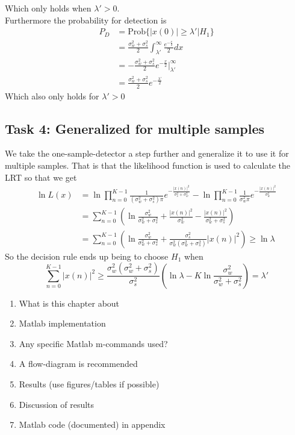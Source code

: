 Which only holds when $\lambda'>0$.\\
Furthermore the probability for detection is
\begin{align}
    P_D & = \text{Prob}\{|x(0)|\geq\lambda'\vert H_1\}\nonumber\\
    & = \frac{\sigma_w^2+\sigma_s^2}{2}\int_{\lambda'}^{\infty}\frac{e^{-\frac{x}{2}}}{2}dx\nonumber\\
    & = -\frac{\sigma_w^2+\sigma_s^2}{2}e^{-\frac{x}{2}}\bigg\rvert_{\lambda'}^{\infty}\nonumber\\
    & = \frac{\sigma_w^2+\sigma_s^2}{2}e^{-\frac{\lambda'}{2}}\nonumber
\end{align}
Which also only holds for $\lambda'>0$\\
\subsection{Task 4: Generalized for multiple samples}
We take the one-sample-detector a step further and generalize it to use it for multiple samples. That is that the likelihood function is used to calculate the LRT so that we get
\begin{align}
    \ln L(x) & = \ln\prod_{n=0}^{K-1}\frac{1}{(\sigma_w^2+\sigma_s^2)\pi}e^{-\frac{|x(n)|^2}{\sigma_s^2+\sigma_w^2}}-\ln\prod_{n=0}^{K-1}\frac{1}{\sigma_w^2\pi}e^{-\frac{|x(n)|^2}{\sigma_w^2}}\nonumber\\
    & = \sum_{n=0}^{K-1}\left(\ln\frac{\sigma_w^2}{\sigma_w^2+\sigma_s^2} + \frac{|x(n)|^2}{\sigma_w^2}-\frac{|x(n)|^2}{\sigma_w^2+\sigma_s^2} \right)\nonumber\\
    & = \sum_{n=0}^{K-1}\left(\ln\frac{\sigma_w^2}{\sigma_w^2+\sigma_s^2} + \frac{\sigma_s^2}{\sigma_w^2(\sigma_w^2+\sigma_s^2)}|x(n)|^2\right)\geq\ln\lambda\nonumber
\end{align}
So the decision rule ends up being to choose $H_1$ when
\begin{equation}
    \sum_{n=0}^{K-1}|x(n)|^2 \geq \frac{\sigma_w^2(\sigma_w^2+\sigma_s^2)}{\sigma_s^2}\left(\ln\lambda-K\ln\frac{\sigma_w^2}{\sigma_w^2+\sigma_s^2}\right) = \lambda'
\end{equation}
\begin{enumerate}[i]
    \item What is this chapter about
    \item Matlab implementation
    \item Any specific Matlab m-commands used?
    \item A flow-diagram is recommended
    \item Results (use figures/tables if possible)
    \item Discussion of results
    \item Matlab code (documented) in appendix
\end{enumerate}